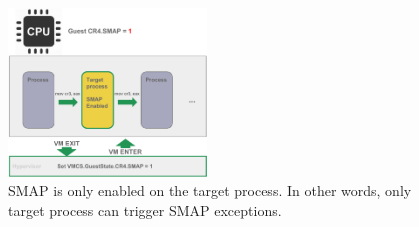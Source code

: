 \begin{figure}[th]
  \includegraphics[width=0.47\textwidth]{figures/processmap}
  \centering
  \caption{SMAP is only enabled on the target process. In other words, only target process can trigger SMAP exceptions.}
  \label{fig:processmap}
\end{figure}
